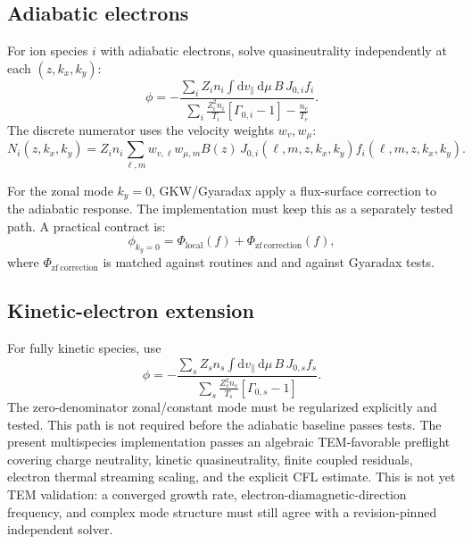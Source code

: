 \documentclass[11pt,a4paper]{article}
\newcommand{\dd}{\mathrm{d}}
\newcommand{\vpar}{v_{\parallel}}
\begin{document}
\subsection{Adiabatic electrons}

For ion species \(i\) with adiabatic electrons, solve quasineutrality independently at each \((z,k_x,k_y)\):
\begin{equation}
  \phi
  =
  -
  \frac{
    \displaystyle
    \sum_i
    Z_i n_i
    \int \dd\vpar\,\dd\mu\,
    B\,J_{0,i} f_i
  }{
    \displaystyle
    \sum_i
    \frac{Z_i^2 n_i}{T_i}
    \left[\Gamma_{0,i}-1\right]
    -
    \frac{n_e}{T_e}
  }.
  \label{eq:phi-adiabatic}
\end{equation}
The discrete numerator uses the velocity weights \(w_v,w_\mu\):
\begin{equation}
  N_i(z,k_x,k_y)
  =
  Z_i n_i
  \sum_{\ell,m}
  w_{v,\ell} w_{\mu,m}
  B(z)\,
  J_{0,i}(\ell,m,z,k_x,k_y)
  f_i(\ell,m,z,k_x,k_y).
  \label{eq:phi-numerator-discrete}
\end{equation}

For the zonal mode \(k_y=0\), GKW/Gyaradax apply a flux-surface correction to the adiabatic response.  The implementation must keep this as a separately tested path.  A practical contract is:
\begin{equation}
  \phi_{k_y=0}
  =
  \Phi_{\mathrm{local}}(f)
  +
  \Phi_{\mathrm{zf\ correction}}(f),
  \label{eq:zonal-correction-contract}
\end{equation}
where \(\Phi_{\mathrm{zf\ correction}}\) is matched against  routines  and  and against Gyaradax tests.

\subsection{Kinetic-electron extension}

For fully kinetic species, use
\begin{equation}
  \phi
  =
  -
  \frac{
    \displaystyle
    \sum_s
    Z_s n_s
    \int \dd\vpar\,\dd\mu\,
    B\,J_{0,s} f_s
  }{
    \displaystyle
    \sum_s
    \frac{Z_s^2 n_s}{T_s}
    \left[\Gamma_{0,s}-1\right]
  }.
  \label{eq:phi-kinetic}
\end{equation}
The zero-denominator zonal/constant mode must be regularized explicitly and tested.  This path is not required before the adiabatic baseline passes tests.  The present multispecies implementation passes an algebraic TEM-favorable preflight covering charge neutrality, kinetic quasineutrality, finite coupled residuals, electron thermal streaming scaling, and the explicit CFL estimate.  This is not yet TEM validation: a converged growth rate, electron-diamagnetic-direction frequency, and complex mode structure must still agree with a revision-pinned independent solver.
\end{document}
